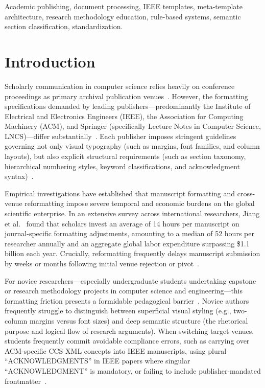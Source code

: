 \documentclass[conference]{IEEEtran}
\begin{document}
\begin{IEEEkeywords}
Academic publishing, document processing, IEEE templates, meta-template architecture, research methodology education, rule-based systems, semantic section classification, standardization.
\end{IEEEkeywords}

\section{Introduction}
Scholarly communication in computer science relies heavily on conference proceedings as primary archival publication venues~\cite{jiang2019time}. However, the formatting specifications demanded by leading publishers---predominantly the Institute of Electrical and Electronics Engineers (IEEE), the Association for Computing Machinery (ACM), and Springer (specifically Lecture Notes in Computer Science, LNCS)---differ substantially~\cite{ahmed2020systematic, ieee2024author}. Each publisher imposes stringent guidelines governing not only visual typography (such as margins, font families, and column layouts), but also explicit structural requirements (such as section taxonomy, hierarchical numbering styles, keyword classifications, and acknowledgment syntax)~\cite{acm2024template, springer2024lncs}.

Empirical investigations have established that manuscript formatting and cross-venue reformatting impose severe temporal and economic burdens on the global scientific enterprise. In an extensive survey across international researchers, Jiang et al.~\cite{jiang2019time} found that scholars invest an average of 14 hours per manuscript on journal-specific formatting adjustments, amounting to a median of 52 hours per researcher annually and an aggregate global labor expenditure surpassing \$1.1 billion each year. Crucially, reformatting frequently delays manuscript submission by weeks or months following initial venue rejection or pivot~\cite{jiang2019time}.

For novice researchers---especially undergraduate students undertaking capstone or research methodology projects in computer science and engineering---this formatting friction presents a formidable pedagogical barrier~\cite{duransilva2024sasc}. Novice authors frequently struggle to distinguish between superficial visual styling (e.g., two-column margins versus font sizes) and deep semantic structure (the rhetorical purpose and logical flow of research arguments). When switching target venues, students frequently commit avoidable compliance errors, such as carrying over ACM-specific CCS XML concepts into IEEE manuscripts, using plural ``ACKNOWLEDGMENTS'' in IEEE papers where singular ``ACKNOWLEDGMENT'' is mandatory, or failing to include publisher-mandated frontmatter~\cite{duransilva2024sasc, lo2020s2orc}.
\end{document}
